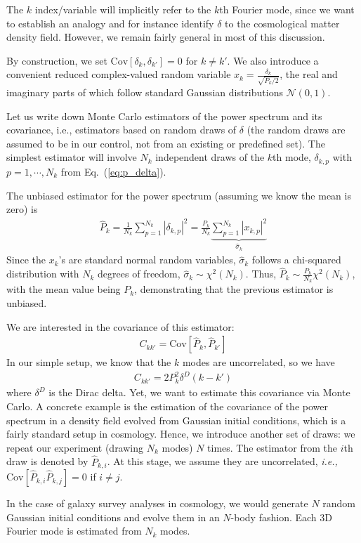 \documentclass{aastex6}
\newcommand{\ie}{{\textit{i.e.,}~}}
\newcommand{\equref}[1]{{\xspace}Eq.~(\ref{#1})}
\newcommand{\eqn}[1]{\begin{eqnarray}#1\end{eqnarray}}
\begin{document}
The $k$ index/variable will implicitly refer to the $k$th Fourier mode, since we want to establish an analogy and for instance identify $\delta$ to the cosmological matter density field. However, we remain fairly general in most of this discussion.

By construction, we set $\mathrm{Cov}[\delta_k, \delta_{k'}] = 0$ for $k\neq k'$. We also introduce a convenient reduced complex-valued random variable $x_k = \frac{\delta_k}{\sqrt{P_k/2}}$, the real and imaginary parts of which follow standard Gaussian distributions $\mathcal{N}(0, 1)$.

Let us write down Monte Carlo estimators of the power spectrum and its covariance, i.e., estimators based on random draws of $\delta$ (the random draws are assumed to be in our control, not from an existing or predefined set). The simplest estimator will involve $N_k$ independent draws of the $k$th mode, $\delta_{k,p}$ with $p=1, \cdots, N_k$ from \equref{eq:p_delta}. 

The unbiased estimator for the power spectrum (assuming we know the mean is zero) is
\eqn{
	\hat{P}_{k} = \frac{1}{N_k} \sum_{p=1}^{N_k} |\delta_{k,p}|^2 =\frac{P_k}{N_k } \underbrace{\sum_{p=1}^{N_k} |x_{k,p}|^2 }_{\hat{\sigma}_k}
}
Since the $x_k$'s are standard normal random variables, $\hat{\sigma}_k$ follows a chi-squared distribution with $N_k$ degrees of freedom, $\hat{\sigma}_k \sim \chi^2(N_k)$. 
Thus, $\hat{P}_{k} \sim \frac{P_k}{N_k }  \chi^2(N_k)$, with the mean value being $P_k$, demonstrating that the previous estimator is unbiased.

We are interested in the covariance of this estimator:
\eqn{
	C_{kk'} = \mathrm{Cov}[\hat{P}_{k}, \hat{P}_{k'}]
}
In our simple setup, we know that the $k$ modes are uncorrelated, so we have
\eqn{
	C_{kk'} = 2{P}^2_{k} \delta^D(k-k')
}
where $ \delta^D$ is the Dirac delta. Yet, we want to estimate this covariance via Monte Carlo.
A concrete example is the estimation of the covariance of the power spectrum in a density field evolved from Gaussian initial conditions, which is a fairly standard setup in cosmology.
Hence, we introduce another set of draws: we repeat our experiment (drawing $N_k$ modes) $N$ times. The estimator from the $i$th draw is denoted by $\hat{P}_{k, i}$. 
At this stage, we assume they are uncorrelated, \ie $\mathrm{Cov}[\hat{P}_{k, i}\hat{P}_{k, j}] = 0$ if $i\neq j$.

In the case of galaxy survey analyses in cosmology, we would generate $N$ random Gaussian initial conditions and evolve them in an $N$-body fashion. Each 3D Fourier mode is estimated from $N_k$ modes.
\end{document}
